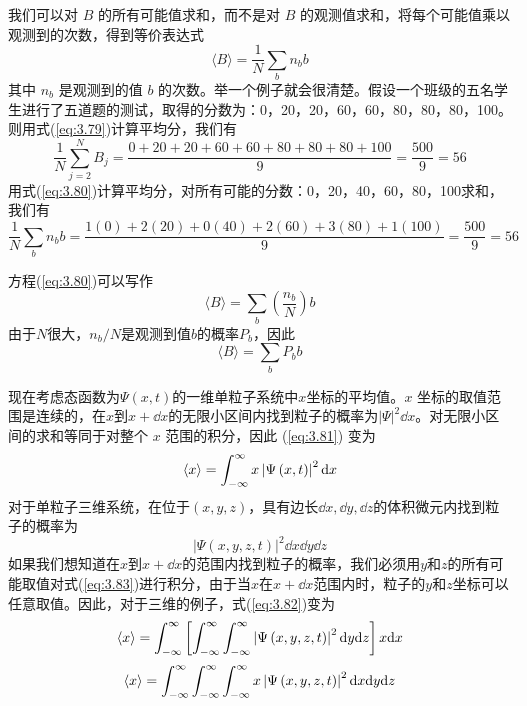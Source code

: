 	我们可以对 $B$ 的所有可能值求和，而不是对 $B$ 的观测值求和，将每个可能值乘以观测到的次数，得到等价表达式
	\begin{equation}
		\langle B \rangle = \frac{1}{N}\sum_{b}n_bb
		\label{eq:3.80}
	\end{equation}
	其中 $n_b$ 是观测到的值 $b$ 的次数。举一个例子就会很清楚。假设一个班级的五名学生进行了五道题的测试，取得的分数为：0，20，20，60，60，80，80，80，100。则用式(\ref{eq:3.79})计算平均分，我们有
	\begin{equation*}
		\frac{1}{N}\sum_{j=2}^{N}B_j = \frac{0+20+20+60+60+80+80+80+100}{9} = \frac{500}{9} = 56
	\end{equation*}
	用式(\ref{eq:3.80})计算平均分，对所有可能的分数：0，20，40，60，80，100求和，我们有
	\begin{equation*}
		\frac{1}{N}\sum_{b}n_bb = \frac{1\left(0\right)+2\left(20\right)+0\left(40\right)+2\left(60\right)+3\left(80\right)+1\left(100\right)}{9} = \frac{500}{9} = 56
	\end{equation*}

	方程(\ref{eq:3.80})可以写作
	\begin{equation*}
		\langle B \rangle = \sum_{b}\left(\frac{n_b}{N}\right)b
	\end{equation*}
	由于$N$很大，$n_b/N$是观测到值$b$的概率$P_b$，因此
	\begin{equation}
		\langle B \rangle = \sum_{b}P_bb
		\label{eq:3.81}
	\end{equation}

	现在考虑态函数为$\Psi\left(x,t\right)$的一维单粒子系统中$x$坐标的平均值。$x$ 坐标的取值范围是连续的，在$x$到$x+\dd x$的无限小区间内找到粒子的概率为$\left|\Psi\right|^2\dd x$。对无限小区间的求和等同于对整个 $x$ 范围的积分，因此 (\ref{eq:3.81}) 变为
	\begin{equation}
		\langle x \rangle = \int_{-\infty}^{\infty} x\left|\Psi\left(x,t\right)\right|^2\dd x
		\label{eq:3.82}
	\end{equation}
	对于单粒子三维系统，在位于$\left(x,y,z\right)$，具有边长$\dd x,\dd y,\dd z$的体积微元内找到粒子的概率为
	\begin{equation}
		\left|\Psi\left(x,y,z,t\right)\right|^2\dd x\dd y\dd z
		\label{eq:3.83}
	\end{equation}
	如果我们想知道在$x$到$x+\dd x$的范围内找到粒子的概率，我们必须用$y$和$z$的所有可能取值对式(\ref{eq:3.83})进行积分，由于当$x$在$x+\dd x$范围内时，粒子的$y$和$z$坐标可以任意取值。因此，对于三维的例子，式(\ref{eq:3.82})变为
	\begin{equation}
		\langle x \rangle = \int_{-\infty}^{\infty} \left[\int_{-\infty}^{\infty} \int_{-\infty}^{\infty} \left|\Psi\left(x,y,z,t\right)\right|^2\dd y\dd z\right]x\dd x
		\label{eq:3.84}
	\end{equation}
	\begin{equation*}
		\langle x \rangle = \int_{-\infty}^{\infty} \int_{-\infty}^{\infty} \int_{-\infty}^{\infty} x\left|\Psi\left(x,y,z,t\right)\right|^2\dd x\dd y\dd z
	\end{equation*}

